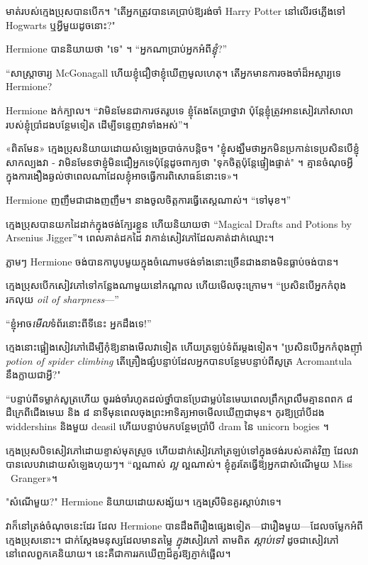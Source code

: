 មាត់របស់ក្មេងប្រុសបានបើក។ "តើអ្នកត្រូវបានគេប្រាប់ឱ្យរង់ចាំ Harry Potter នៅលើរថភ្លើងទៅ Hogwarts ឬអ្វីមួយដូចនោះ?"

Hermione បាននិយាយថា "ទេ" ។ “អ្នកណាប្រាប់អ្នកអំពី\emph{ខ្ញុំ}?”

“សាស្រ្តាចារ្យ McGonagall ហើយខ្ញុំជឿថាខ្ញុំឃើញមូលហេតុ។ តើ​អ្នក​មាន​ការ​ចង​ចាំ​ដ៏​អស្ចារ្យ​ទេ Hermione?

Hermione ងក់ក្បាល។ “វាមិនមែនជាការថតរូបទេ ខ្ញុំតែងតែប្រាថ្នាវា ប៉ុន្តែខ្ញុំត្រូវអានសៀវភៅសាលារបស់ខ្ញុំប្រាំដងបន្ថែមទៀត ដើម្បីទន្ទេញវាទាំងអស់”។

«ពិត​មែន» ក្មេង​ប្រុស​និយាយ​ដោយ​សំឡេង​ច្របាច់​ក​បន្តិច។ "ខ្ញុំសង្ឃឹមថាអ្នកមិនប្រកាន់ទេប្រសិនបើខ្ញុំសាកល្បងវា - វាមិនមែនថាខ្ញុំមិនជឿអ្នកទេប៉ុន្តែដូចពាក្យថា "ទុកចិត្តប៉ុន្តែផ្ទៀងផ្ទាត់" ។ គ្មាន​ចំណុច​អ្វី​ក្នុង​ការ​ងឿង​ឆ្ងល់​ថា​ពេល​ណា​ដែល​ខ្ញុំ​អាច​ធ្វើ​ការ​ពិសោធន៍​នោះ​ទេ»។

Hermione ញញឹមជាជាងញញឹម។ នាងចូលចិត្តការធ្វើតេស្តណាស់។ “ទៅមុខ។”

ក្មេង​ប្រុស​បាន​យក​ដៃ​ដាក់​ក្នុង​ថង់​ក្បែរ​ខ្លួន ហើយ​និយាយ​ថា “Magical Drafts and Potions by Arsenius Jigger”។ ពេល​គាត់​ដក​ដៃ វា​កាន់​សៀវភៅ​ដែល​គាត់​ដាក់​ឈ្មោះ។

ភ្លាមៗ Hermione ចង់បានកាបូបមួយក្នុងចំណោមថង់ទាំងនោះច្រើនជាងនាងមិនធ្លាប់ចង់បាន។

ក្មេងប្រុសបើកសៀវភៅទៅកន្លែងណាមួយនៅកណ្តាល ហើយមើលចុះក្រោម។ “ប្រសិនបើអ្នកកំពុងរកលុយ \emph{oil of sharpness}—”

“ខ្ញុំអាច\emph{មើល}ទំព័រនោះពីទីនេះ អ្នកដឹងទេ!”

ក្មេង​នោះ​ផ្អៀង​សៀវភៅ​ដើម្បី​កុំ​ឱ្យ​នាង​មើល​វា​ទៀត ហើយ​ត្រឡប់​ទំព័រ​ម្ដង​ទៀត។ "ប្រសិនបើអ្នកកំពុងញ៉ាំ \emph{ potion of spider climbing} តើគ្រឿងផ្សំបន្ទាប់ដែលអ្នកបានបន្ថែមបន្ទាប់ពីសូត្រ Acromantula នឹងក្លាយជាអ្វី?"

“បន្ទាប់ពីទម្លាក់សូត្រហើយ ចូររង់ចាំរហូតដល់ថ្នាំបានប្រែជាម្លប់នៃមេឃពេលព្រឹកព្រលឹមគ្មានពពក ៨ ដឺក្រេពីជើងមេឃ និង ៨ នាទីមុនពេលចុងព្រះអាទិត្យអាចមើលឃើញជាមុន។ កូរឱ្យប្រាំបីដង widdershins និងមួយ deasil ហើយបន្ទាប់មកបន្ថែមប្រាំបី dram នៃ unicorn bogies ។

ក្មេងប្រុសបិទសៀវភៅដោយខ្ទាស់មុតស្រួច ហើយដាក់សៀវភៅត្រឡប់ទៅក្នុងថង់របស់គាត់វិញ ដែលវាបានលេបវាដោយសំឡេងហុយៗ។ “ល្អណាស់ \emph{ល្អ} ល្អណាស់។ ខ្ញុំ​គួរ​តែ​ធ្វើ​ឱ្យ​អ្នក​ជា​សំណើ​មួយ Miss ~Granger»។

"សំណើមួយ?" Hermione និយាយដោយសង្ស័យ។ ក្មេងស្រីមិនគួរស្តាប់វាទេ។

វាក៏នៅត្រង់ចំណុចនេះដែរ ដែល Hermione បានដឹងពីរឿងផ្សេងទៀត—ជារឿងមួយ—ដែលចម្លែកអំពីក្មេងប្រុសនោះ។ ជាក់ស្តែងមនុស្សដែលមានតម្លៃ \emph{ក្នុង}សៀវភៅ តាមពិត \emph{ស្តាប់ទៅ} ដូចជាសៀវភៅនៅពេលពួកគេនិយាយ។ នេះគឺជាការរកឃើញដ៏គួរឱ្យភ្ញាក់ផ្អើល។

